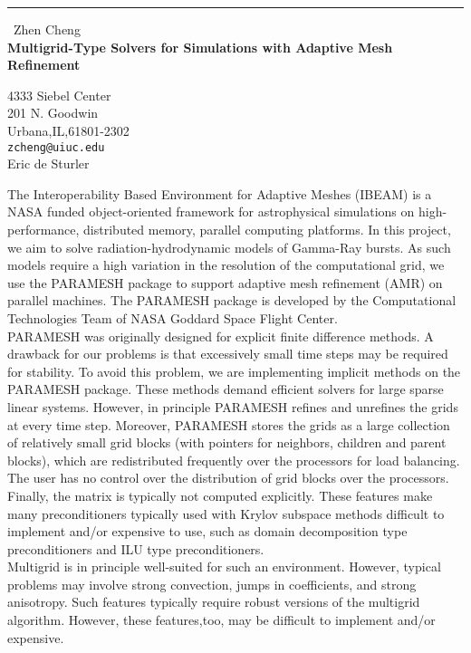 \documentclass{report}
\begin{document}
\begin{center}
\rule{6in}{1pt} \
{\large Zhen Cheng \\
{\bf Multigrid-Type Solvers for Simulations with Adaptive Mesh Refinement}}

4333 Siebel Center \\ 201 N. Goodwin \\ Urbana,IL,61801-2302
\\
{\tt zcheng@uiuc.edu}\\
Eric de Sturler\end{center}

The Interoperability Based Environment for Adaptive Meshes (IBEAM) is
a NASA funded object-oriented framework for astrophysical
simulations on high-performance, distributed memory, parallel
computing platforms. In this project, we aim to solve
radiation-hydrodynamic models of Gamma-Ray bursts. As such
models require a high variation in the resolution of the computational grid,
we use the PARAMESH package to support adaptive mesh refinement (AMR) on
parallel machines. The PARAMESH package is developed by the Computational Technologies
Team of NASA Goddard Space Flight Center.\\

PARAMESH was originally designed for explicit finite difference
methods. A drawback for our problems is that excessively small
time steps may be required for stability. To avoid this problem,
we are implementing implicit methods on the PARAMESH package.
These methods demand efficient solvers for large sparse linear
systems. However, in principle PARAMESH refines and unrefines the
grids at every time step. Moreover, PARAMESH stores the grids as a
large collection of relatively small grid blocks (with pointers
for neighbors, children and parent blocks), which are
redistributed frequently over the processors for load balancing.
The user has no control over the distribution of grid blocks over
the processors. Finally, the matrix is typically not computed
explicitly. These features make many preconditioners typically
used with Krylov subspace methods difficult to implement and/or
expensive to use, such as domain decomposition type
preconditioners and ILU type
preconditioners.\\

Multigrid is in principle well-suited for such an environment. However,
typical problems may involve strong convection, jumps in coefficients, and
strong anisotropy. Such features typically require robust versions of the
multigrid algorithm. However, these features,too, may be difficult to implement
and/or expensive.\\
\end{document}
